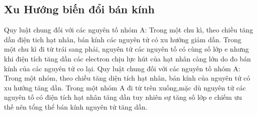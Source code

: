 \subsection{Xu Hướng biến đổi bán kính}
\begin{hoplythuyet}
		Quy luật chung đối với các nguyên tố nhóm A: Trong một chu kì, theo chiều tăng dần điện tich hạt nhân, bán kính các nguyên tử có xu hướng giảm dần.
	Trong một chu kì đi từ trái sang phải, nguyên tử các nguyên tố có cùng số lớp e nhưng khi điện tích tăng dần các electron chịu lực hút của hạt nhân càng lớn do đo bán kính của các nguyên tử co lại.
	Quy luật chung đối với các nguyên tố nhóm A: Trong một nhóm, theo chiều tăng diện tích hạt nhân, bán kính của nguyên tử có xu hướng tăng dần.
	Trong một nhóm A đi từ trên xuống,mặc dù nguyên tử các nguyên tố có điện tích hạt nhân tăng dần tuy nhiên sự tăng số lớp e chiếm ưu thế nên tổng thể bán kính nguyên tử tăng dần.
\end{hoplythuyet}
